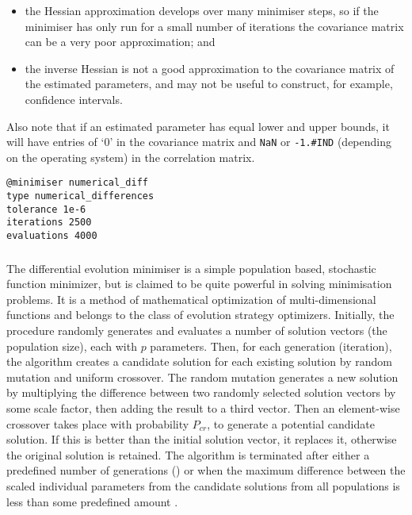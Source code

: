 \begin{itemize}
\item the Hessian approximation develops over many minimiser steps, so if the minimiser has only run for a small number of iterations the covariance matrix can be a very poor approximation; and
\item the inverse Hessian is not a good approximation to the covariance matrix of the estimated parameters, and may not be useful to construct, for example, confidence intervals.
\end{itemize}

Also note that if an estimated parameter has equal lower and upper bounds, it will have entries of `0' in the covariance matrix and \texttt{NaN} or \texttt{-1.\#IND} (depending on the operating system) in the correlation matrix.

{\small{\begin{verbatim}
@minimiser numerical_diff
type numerical_differences
tolerance 1e-6
iterations 2500
evaluations 4000
\end{verbatim}}}

\subsubsection{}

The differential evolution minimiser is a simple population based, stochastic function minimizer, but is claimed to be quite powerful in solving minimisation problems. It is a method of mathematical optimization of multi-dimensional functions and belongs to the class of evolution strategy optimizers. Initially, the procedure randomly generates and evaluates a number of solution vectors (the population size), each with $p$ parameters. Then, for each generation (iteration), the algorithm creates a candidate solution for each existing solution by random mutation and uniform crossover. The random mutation generates a new solution by multiplying the difference between two randomly selected solution vectors by some scale factor, then adding the result to a third vector. Then an element-wise crossover takes place with probability $P_{cr}$, to generate a potential candidate solution. If this is better than the initial solution vector, it replaces it, otherwise the original solution is retained. The algorithm is terminated after either a predefined number of generations () or when the maximum difference between the scaled individual parameters from the candidate solutions from all populations is less than some predefined amount .

